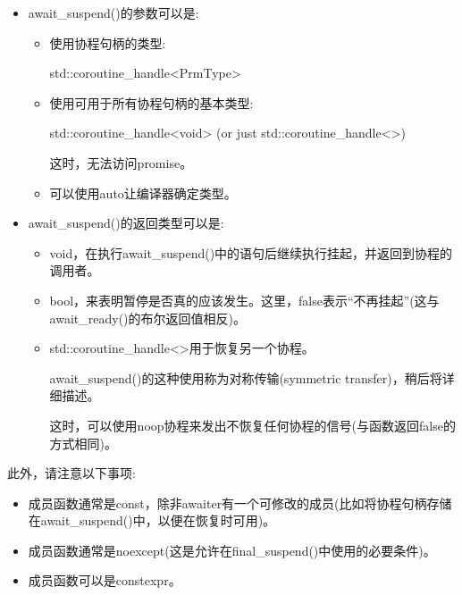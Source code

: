 \begin{itemize}
\item 
await\_suspend()的参数可以是:

\begin{itemize}
\item 
使用协程句柄的类型:
\begin{cpp}
std::coroutine_handle<PrmType>
\end{cpp}

\item 
使用可用于所有协程句柄的基本类型:
\begin{cpp}
std::coroutine_handle<void> (or just std::coroutine_handle<>)
\end{cpp}

这时，无法访问promise。

\item 
可以使用auto让编译器确定类型。
\end{itemize}

\item 
await\_suspend()的返回类型可以是:
\begin{itemize}
\item 
void，在执行await\_suspend()中的语句后继续执行挂起，并返回到协程的调用者。

\item 
bool，来表明暂停是否真的应该发生。这里，false表示“不再挂起”(这与await\_ready()的布尔返回值相反)。

\item 
std::coroutine\_handle<>用于恢复另一个协程。

await\_suspend()的这种使用称为对称传输(symmetric transfer)，稍后将详细描述。

这时，可以使用noop协程来发出不恢复任何协程的信号(与函数返回false的方式相同)。
\end{itemize}
\end{itemize}

此外，请注意以下事项:

\begin{itemize}
\item 
成员函数通常是const，除非awaiter有一个可修改的成员(比如将协程句柄存储在await\_suspend()中，以便在恢复时可用)。

\item 
成员函数通常是noexcept(这是允许在final\_suspend()中使用的必要条件)。

\item 
成员函数可以是constexpr。
\end{itemize}

